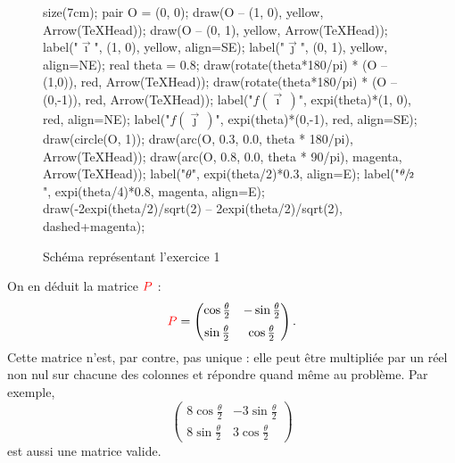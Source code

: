 \begin{exo}
	\begin{figure}[H]
		\centering
		\begin{asy}
			size(7cm);
			pair O = (0, 0);
			draw(O -- (1, 0), yellow, Arrow(TeXHead));
			draw(O -- (0, 1), yellow, Arrow(TeXHead));
			label("$\vec\imath$", (1, 0), yellow, align=SE);
			label("$\vec\jmath$", (0, 1), yellow, align=NE);
			real theta = 0.8;
			draw(rotate(theta*180/pi) * (O -- (1,0)), red, Arrow(TeXHead));
			draw(rotate(theta*180/pi) * (O -- (0,-1)), red, Arrow(TeXHead));
			label("$f(\vec\imath\,)$", expi(theta)*(1, 0), red, align=NE);
			label("$f(\vec\jmath\,)$", expi(theta)*(0,-1), red, align=SE);
			draw(circle(O, 1));
			draw(arc(O, 0.3, 0.0, theta * 180/pi), Arrow(TeXHead));
			draw(arc(O, 0.8, 0.0, theta * 90/pi), magenta, Arrow(TeXHead));
			label("$\theta$", expi(theta/2)*0.3, align=E);
			label("$\sfrac\theta2$", expi(theta/4)*0.8, magenta, align=E);
			draw(-2expi(theta/2)/sqrt(2) -- 2expi(theta/2)/sqrt(2), dashed+magenta);
		\end{asy}
		\caption{Schéma représentant l'{\sc exercice}\/ 1}
	\end{figure}
	On en déduit la matrice ${\color{red}P}$\/ : \[
		{\color{red}P} = \begin{pmatrix}
			\cos \frac{\theta}{2} & -\sin \frac{\theta}{2}\\[2mm]
			\sin \frac{\theta}{2}&\cos \frac{\theta}{2}
		\end{pmatrix}
	.\] Cette matrice n'est, par contre, pas unique : elle peut être multipliée par un réel non nul sur chacune des colonnes et répondre quand même au problème. Par exemple, \[
		\begin{pmatrix}
			8 \cos\frac{\theta}{2}&-3\sin\frac{\theta}{2}\\[2mm]
			8\sin\frac{\theta}{2}&3\cos\frac{\theta}{2}
		\end{pmatrix}
	\] est aussi une matrice valide.



\end{exo}
